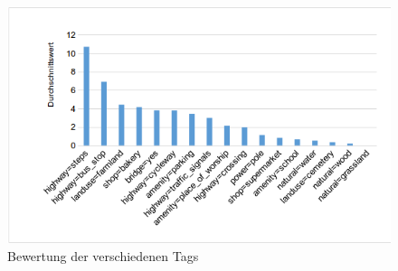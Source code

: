 \begin{figure}[H]
\begin{center}
\includegraphics[width=150mm]{images/ch6_img07_result1.png}
\caption{Bewertung der verschiedenen Tags}
\label{img:ch6_img07_result1}
\end{center}
\end{figure}